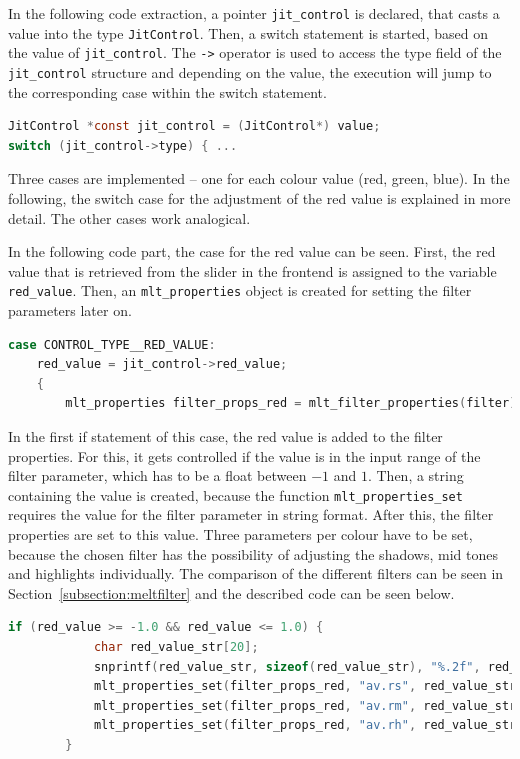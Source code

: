 \documentclass[../MasterThesis.tex]{subfiles}
\begin{document}
In the following code extraction, a pointer \texttt{jit\_control} is declared, that casts a value into the type \texttt{JitControl}.
Then, a switch statement is started, based on the value of \texttt{jit\_control}.
The \texttt{->} operator is used to access the type field of the \texttt{jit\_control} structure and depending on the value, the execution will jump to the corresponding case within the switch statement.

\begin{lstlisting}[language=c, numbers=none, columns=fullflexible]		
JitControl *const jit_control = (JitControl*) value;
switch (jit_control->type) { ...
\end{lstlisting}

Three cases are implemented -- one for each colour value (red, green, blue). In the following, the switch case for the adjustment of the red value is explained in more detail. The other cases work analogical.

In the following code part, the case for the red value can be seen. First, the red value that is retrieved from the slider in the frontend is assigned to the variable \texttt{red\_value}. Then, an \texttt{mlt\_properties} object is created for setting the filter parameters later on. 

\begin{lstlisting}[language=c, numbers=none, columns=fullflexible]			
case CONTROL_TYPE__RED_VALUE:
	red_value = jit_control->red_value;
	{
		mlt_properties filter_props_red = mlt_filter_properties(filter);
\end{lstlisting}

In the first if statement of this case, the red value is added to the filter properties. For this, it gets controlled if the value is in the input range of the filter parameter, which has to be a float between $-1$ and $1$. Then, a string containing the value is created, because the function \texttt{mlt\_properties\_set} requires the value for the filter parameter in string format. After this, the filter properties are set to this value. Three parameters per colour have to be set, because the chosen filter has the possibility of adjusting the shadows, mid tones and highlights individually. 
The comparison of the different filters can be seen in Section~\ref{subsection:meltfilter} and the described code can be seen below.


\begin{lstlisting}[language=c, numbers=none, columns=fullflexible]
		if (red_value >= -1.0 && red_value <= 1.0) {
			char red_value_str[20]; 
			snprintf(red_value_str, sizeof(red_value_str), "%.2f", red_value);
			mlt_properties_set(filter_props_red, "av.rs", red_value_str);
			mlt_properties_set(filter_props_red, "av.rm", red_value_str);
			mlt_properties_set(filter_props_red, "av.rh", red_value_str);
		}	
\end{lstlisting}
\end{document}
